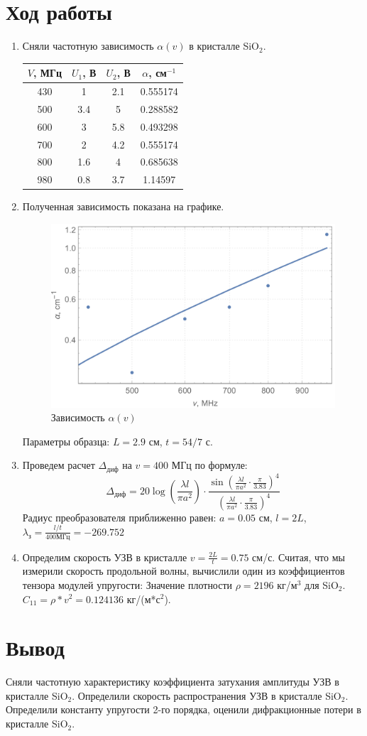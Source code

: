\documentclass[a4paper, 12pt]{article}
\begin{document}
	\section{Ход работы}
	\begin{enumerate}
		\item Сняли частотную зависимость $\alpha(v)$ в кристалле SiO$_2$.
		\begin{table}[!htb]
			\centering
			\begin{tabular}{|c|c|c|c|}
				\hline
				$V$, МГц & $U_1$, В & $U_2$, В & $\alpha$, см$^{-1}$\\
				\hline
				430 & 1 & 2.1 & 0.555174\\
				500 & 3.4 & 5 & 0.288582\\
				600 & 3 & 5.8 & 0.493298\\
				700 & 2 & 4.2 & 0.555174\\
				800 & 1.6 & 4 & 0.685638\\
				980 & 0.8 & 3.7 & 1.14597\\
				\hline
			\end{tabular}
		\end{table}
		\item Полученная зависимость показана на графике.
		\begin{figure}[!htb]
			\centering
			\includegraphics[width=\textwidth]{graph.pdf}
			\caption{Зависимость $\alpha(v)$}
		\end{figure}
		Параметры образца:
		$L=2.9$ см, $t=54/7$ с.
		\item Проведем расчет $\Delta_{\text{диф}}$ на $v=400$ МГц по формуле:
		\begin{equation}
			\Delta_{\text{диф}}=20 \log(\frac{\lambda l}{\pi a^2})\cdot\frac{\sin(\frac{\lambda l}{\pi a^2}\cdot\frac{\pi}{3.83})^4}{(\frac{\lambda l}{\pi a^2}\cdot\frac{\pi}{3.83})^4}
		\end{equation}
		Радиус преобразователя приближенно равен:
		$a=0.05$ см, $l=2 L$, $\lambda_{\text{з}}=\frac{l/t}{400\text{МГц}}=-269.752$
		\item Определим скорость УЗВ в кристалле
		$v=\frac{2L}{t}=0.75$ см/с.
		Считая, что мы измерили скорость продольной волны, вычислили один из коэффициентов тензора модулей упругости:
		Значение плотности $\rho=2196$ кг/м$^3$ для SiO$_2$.
		$C_{11}=\rho*v^2=0.124136$ кг/(м*с$^2$).
	\end{enumerate}
	\section{Вывод}
	Сняли частотную характеристику коэффициента затухания амплитуды УЗВ в кристалле SiO$_2$. Определили скорость распространения УЗВ в кристалле SiO$_2$. Определили константу упругости 2-го порядка, оценили дифракционные потери в кристалле SiO$_2$.
\end{document}
